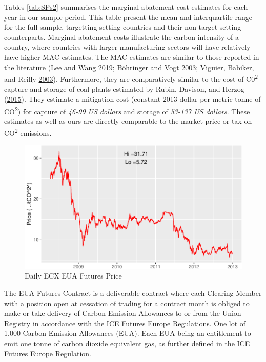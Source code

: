 \documentclass[12pt,]{article}
\begin{document}
Tables \ref{tab:SPs2} summarises the marginal abatement cost estimates for each year in our sample period. This table present the mean and interquartile range for the full sample, targetting setting countries and their non target setting counterparts. Marginal abatement costs illustrate the carbon intensity of a country, where countries with larger manufacturing sectors will have relatively have higher MAC estimates. The MAC estimates are similar to those reported in the literature (Lee and Wang \protect\hyperlink{ref-Lee2019}{2019}; Böhringer and Vogt \protect\hyperlink{ref-Bohringer2003}{2003}; Viguier, Babiker, and Reilly \protect\hyperlink{ref-Viguier2003}{2003}). Furthermore, they are comparatively similar to the cost of C0\textsuperscript{2} capture and storage of coal plants estimated by Rubin, Davison, and Herzog (\protect\hyperlink{ref-Rubin2015}{2015}). They estimate a mitigation cost (constant 2013 dollar per metric tonne of CO\textsuperscript{2}) for capture of \emph{46-99 US dollars} and storage of \emph{53-137 US dollars}. These estimates as well as ours are directly comparable to the market price or tax on CO\textsuperscript{2} emissions.

\begin{figure}[H]

{\centering \includegraphics[width=0.7\linewidth]{lurking_co2_files/figure-latex/ETSprice-1} 

}

\caption{Daily ECX EUA Futures Price}\label{fig:ETSprice}
\end{figure}

\begin{footnotesize} The EUA Futures Contract is a deliverable contract where each Clearing Member with a position open at cessation of trading for a contract month is obliged to make or take delivery of Carbon Emission Allowances to or from the Union Registry in accordance with the ICE Futures Europe Regulations. One lot of 1,000 Carbon Emission Allowances (EUA). Each EUA being an entitlement to emit one tonne of carbon dioxide equivalent gas, as further defined in the ICE Futures Europe Regulation.
\end{footnotesize}
\end{document}
